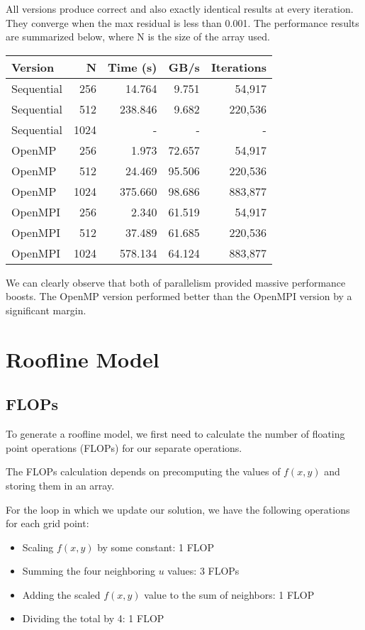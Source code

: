 \documentclass[11pt]{article}
\begin{document}
All versions produce correct and also exactly identical results at every iteration. They converge when the max residual is less than 0.001. The performance results are summarized below, where N is the size of the array used.

\begin{table}[H]
    \centering
    \begin{tabular}{lrrrr}
        \toprule
        Version & N & Time (s) & GB/s & Iterations \\
        \midrule
        Sequential & 256 & 14.764 & 9.751 & 54,917 \\
        Sequential & 512 & 238.846 & 9.682 & 220,536 \\
        Sequential & 1024 & - & - & - \\
        OpenMP & 256 & 1.973 & 72.657 & 54,917 \\
        OpenMP & 512 & 24.469 & 95.506 & 220,536 \\
        OpenMP & 1024 & 375.660 & 98.686 & 883,877 \\
        OpenMPI & 256 & 2.340 & 61.519 & 54,917 \\
        OpenMPI & 512 & 37.489 & 61.685 & 220,536 \\
        OpenMPI & 1024 & 578.134 & 64.124 & 883,877 \\
        \bottomrule
    \end{tabular}
\end{table}

We can clearly observe that both of parallelism provided massive performance boosts. The OpenMP version performed better than the OpenMPI version by a significant margin. 

\section*{Roofline Model}

\subsection*{FLOPs}

To generate a roofline model, we first need to calculate the number of floating point operations (FLOPs) for our separate operations.

The FLOPs calculation depends on precomputing the values of $f(x, y)$ and storing them in an array.

For the loop in which we update our solution, we have the following operations for each grid point:
\begin{itemize}
    \item Scaling $f(x, y)$ by some constant: 1 FLOP
    \item Summing the four neighboring $u$ values: 3 FLOPs
    \item Adding the scaled $f(x, y)$ value to the sum of neighbors: 1 FLOP
    \item Dividing the total by 4: 1 FLOP
\end{itemize}
\end{document}

